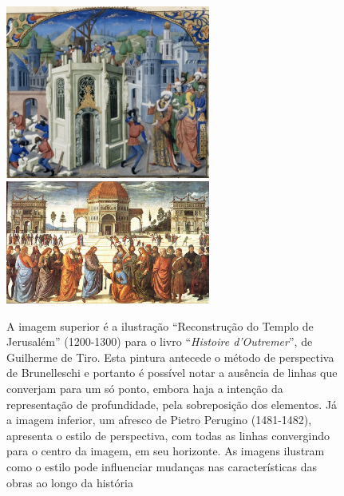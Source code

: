 \begin{figure}[h!]
  \begin{center}
    \includegraphics[width=0.6\textwidth]{figs/perspectiva1.png} \\
    \vspace{1cm}
    \includegraphics[width=0.6\textwidth]{figs/perspectiva2.png}
      \caption{A imagem superior é a ilustração ``Reconstrução do
        Templo de Jerusalém'' (1200-1300) para o livro
        ``\textit{Histoire d'Outremer}'', de Guilherme de Tiro. Esta
        pintura antecede o método de perspectiva de Brunelleschi e
        portanto é possível notar a ausência de linhas que converjam
        para um só ponto, embora haja a intenção da representação de
        profundidade, pela sobreposição dos elementos. Já a imagem
        inferior, um afresco de Pietro Perugino (1481-1482), apresenta
        o estilo de perspectiva, com todas as linhas convergindo para
        o centro da imagem, em seu horizonte. As imagens ilustram como
        o estilo pode influenciar mudanças nas características das
        obras ao longo da história}
      \label{fig:perspectiva}
\end{center}
\end{figure}

